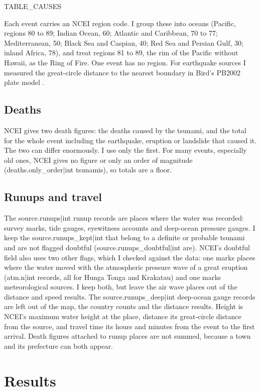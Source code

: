 \documentclass[11pt,a4paper]{article}
\begin{document}
{{TABLE_CAUSES}}

Each event carries an NCEI region code. I group these into oceans (Pacific, regions 80 to 89; Indian Ocean, 60; Atlantic and Caribbean, 70 to 77; Mediterranean, 50; Black Sea and Caspian, 40; Red Sea and Persian Gulf, 30; inland Africa, 78), and treat regions 81 to 89, the rim of the Pacific without Hawaii, as the Ring of Fire. One event has no region. For earthquake sources I measured the great-circle distance to the nearest boundary in Bird's PB2002 plate model \citep{bird}.

\subsection{Deaths}
NCEI gives two death figures: the deaths caused by the tsunami, and the total for the whole event including the earthquake, eruption or landslide that caused it. The two can differ enormously. I use only the first. For many events, especially old ones, NCEI gives no figure or only an order of magnitude ({{deaths.only_order|int}} tsunamis), so totals are a floor.

\subsection{Runups and travel}
The {{source.runups|int}} runup records are places where the water was recorded: survey marks, tide gauges, eyewitness accounts and deep-ocean pressure gauges. I keep the {{source.runups_kept|int}} that belong to a definite or probable tsunami and are not flagged doubtful ({{source.runups_doubtful|int}} are). NCEI's doubtful field also uses two other flags, which I checked against the data: one marks places where the water moved with the atmospheric pressure wave of a great eruption ({{atm.n|int}} records, all for Hunga Tonga and Krakatau) and one marks meteorological sources. I keep both, but leave the air wave places out of the distance and speed results. The {{source.runups_deep|int}} deep-ocean gauge records are left out of the map, the country counts and the distance results. Height is NCEI's maximum water height at the place, distance its great-circle distance from the source, and travel time its hours and minutes from the event to the first arrival. Death figures attached to runup places are not summed, because a town and its prefecture can both appear.

\section{Results}
\end{document}
